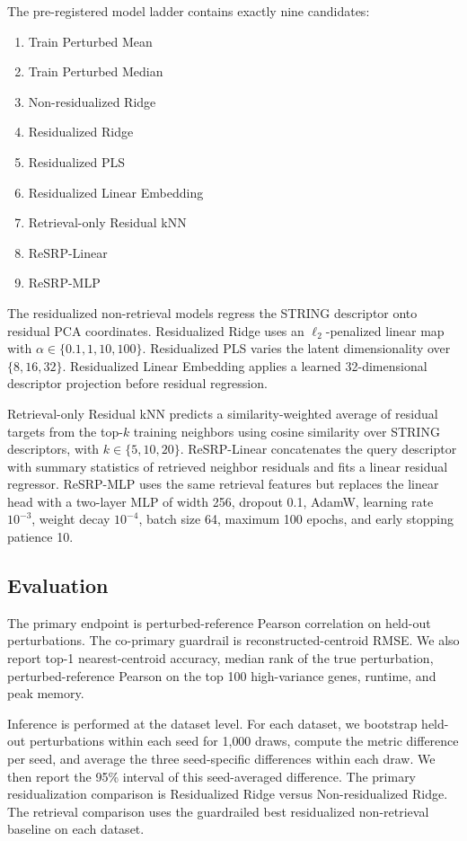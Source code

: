 \documentclass{article}
\begin{document}
The pre-registered model ladder contains exactly nine candidates:
\begin{enumerate}
  \item Train Perturbed Mean
  \item Train Perturbed Median
  \item Non-residualized Ridge
  \item Residualized Ridge
  \item Residualized PLS
  \item Residualized Linear Embedding
  \item Retrieval-only Residual kNN
  \item ReSRP-Linear
  \item ReSRP-MLP
\end{enumerate}

The residualized non-retrieval models regress the STRING descriptor onto residual PCA coordinates. Residualized Ridge uses an $\ell_2$-penalized linear map with $\alpha \in \{0.1,1,10,100\}$. Residualized PLS varies the latent dimensionality over $\{8,16,32\}$. Residualized Linear Embedding applies a learned 32-dimensional descriptor projection before residual regression.

Retrieval-only Residual kNN predicts a similarity-weighted average of residual targets from the top-$k$ training neighbors using cosine similarity over STRING descriptors, with $k \in \{5,10,20\}$. ReSRP-Linear concatenates the query descriptor with summary statistics of retrieved neighbor residuals and fits a linear residual regressor. ReSRP-MLP uses the same retrieval features but replaces the linear head with a two-layer MLP of width 256, dropout 0.1, AdamW, learning rate $10^{-3}$, weight decay $10^{-4}$, batch size 64, maximum 100 epochs, and early stopping patience 10.

\subsection{Evaluation}

The primary endpoint is perturbed-reference Pearson correlation on held-out perturbations. The co-primary guardrail is reconstructed-centroid RMSE. We also report top-1 nearest-centroid accuracy, median rank of the true perturbation, perturbed-reference Pearson on the top 100 high-variance genes, runtime, and peak memory.

Inference is performed at the dataset level. For each dataset, we bootstrap held-out perturbations within each seed for 1{,}000 draws, compute the metric difference per seed, and average the three seed-specific differences within each draw. We then report the 95\% interval of this seed-averaged difference. The primary residualization comparison is Residualized Ridge versus Non-residualized Ridge. The retrieval comparison uses the guardrailed best residualized non-retrieval baseline on each dataset.
\end{document}
